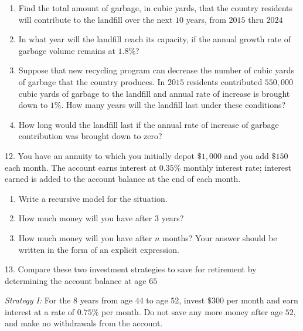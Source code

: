 \documentclass[10pt,]{book}
\theoremstyle{plain}
\theoremstyle{definition}
\theoremstyle{definition}
\theoremstyle{definition}
\numberwithin{equation}{section}
\begin{document}
\begin{exerciselist}
\leavevmode%
\begin{enumerate}[label=(\alph*)]
\item\hypertarget{li-89}{}Find the total amount of garbage, in cubic yards, that the country residents will contribute to the landfill over the next \(10\) years, from \(2015\) thru \(2024\)%
\item\hypertarget{li-90}{}In what year will the landfill reach its capacity, if the annual growth rate of garbage volume remains at \(1.8\%\)?%
\item\hypertarget{li-91}{}Suppose that new recycling program can decrease the number of cubic yards of garbage that the country produces. In \(2015\) residents contributed \(550,000\) cubic yards of garbage to the landfill and annual rate of increase is brought down to \(1\%\).  How many years will the landfill last under these conditions?%
\item\hypertarget{li-92}{}How long would the landfill last if the annual rate of increase of garbage contribution was brought down to zero?%
\end{enumerate}
\par\smallskip
\item[12.]\hypertarget{exercise-43}{}You have an annuity to which you initially depot \(\$1,000\) and you add \(\$150\) each month. The account earns interest at \(0.35\%\) monthly interest rate; interest earned is added to the account balance at the end of each month.%
\leavevmode%
\begin{enumerate}[label=(\alph*)]
\item\hypertarget{li-93}{}Write a recursive model for the situation.%
\item\hypertarget{li-94}{}How much money will you have after \(3\) years?%
\item\hypertarget{li-95}{}How much money will you have after \(n\) months? Your answer should be written in the form of an explicit expression.%
\end{enumerate}
\par\smallskip
\item[13.]\hypertarget{exercise-44}{}Compare these two investment strategies to save for retirement by determining the account balance at age \(65\)%
\par
\emph{Strategy I:} For the \(8\) years from age \(44\) to age \(52\), invest \(\$300\) per month and earn interest at a rate of \(0.75\%\) per month. Do not save any more money after age \(52\), and make no withdrawals from the account.%
\par

\end{exerciselist}
\end{document}
